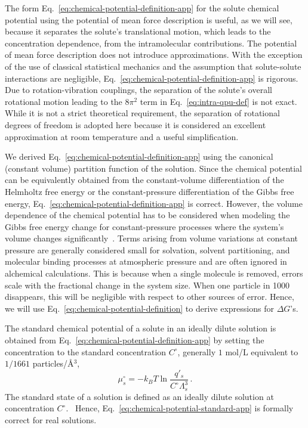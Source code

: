 \documentclass[9pt,bestpractices]{livecoms}
\begin{document}
The form Eq.~\ref{eq:chemical-potential-definition-app} for the solute chemical potential using the potential of mean force description is useful, as we will see, because it separates the solute's translational motion, which leads to the concentration dependence, from the intramolecular contributions. The potential of mean force description does not introduce approximations. With the exception of the use of classical statistical mechanics and the assumption  that solute-solute interactions are negligible, Eq.~\ref{eq:chemical-potential-definition-app} is rigorous. Due to rotation-vibration couplings, the separation of the solute's overall rotational motion leading to the $8 \pi^2$ term in Eq.~\ref{eq:intra-qpu-def} is not exact. While it is not a strict theoretical requirement, the separation of rotational degrees of freedom is adopted here because it is considered an excellent approximation at room temperature and a useful simplification.

We derived Eq.~\ref{eq:chemical-potential-definition-app} using the canonical (constant volume) partition function of the solution. Since the chemical potential can be equivalently obtained from the constant-volume differentiation of the Helmholtz free energy or the constant-pressure differentiation of the Gibbs free energy, Eq.~\ref{eq:chemical-potential-definition-app} is correct. However, the volume dependence of the chemical potential has to be considered when modeling the Gibbs free energy change for constant-pressure processes where the system's volume changes significantly~\cite{gilson1997statisticalthermodynamic}. Terms arising from volume variations at constant pressure are generally considered small for solvation, solvent partitioning, and molecular binding processes at atmospheric pressure and are often ignored in alchemical calculations.  This is because when a single molecule is removed, errors scale with the fractional change in the system size.  When one particle in 1000 disappears, this will be negligible with respect to other sources of error. Hence, we will use Eq.~\ref{eq:chemical-potential-definition} to derive expressions for $\Delta G$'s.

The standard chemical potential of a solute in an ideally dilute solution is obtained from Eq.~\ref{eq:chemical-potential-definition-app} by setting the concentration to the standard concentration $C^\circ$, generally $1$ mol/L equivalent to $1/1661$ particles/\AA$^{3}$, 
\begin{equation}
  \mu_s^\circ = -k_B T \ln \frac{q'_s}{C^\circ \Lambda_s^3} \, .
  \label{eq:chemical-potential-standard-app}
\end{equation}
The standard state of a solution is defined as an ideally dilute solution at concentration $C^\circ$.~\cite{levine2009physicalchemistrybook6ed} Hence, Eq.~\ref{eq:chemical-potential-standard-app} is formally correct for real solutions.
\end{document}
